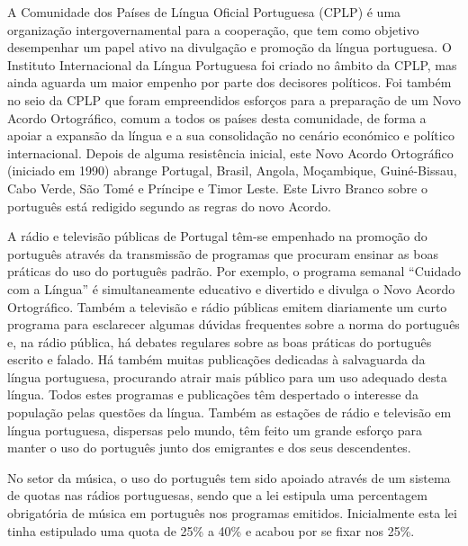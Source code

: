 \documentclass[]{../metanetpaper}
\begin{document}
\begin{multicols}{2}

A Comunidade dos Países de Língua Oficial Portuguesa (CPLP) é uma organização intergovernamental para a cooperação, que tem como objetivo desempenhar um papel ativo na divulgação e promoção da língua portuguesa. O Instituto Internacional da Língua Portuguesa foi criado no âmbito da CPLP, mas ainda aguarda um maior empenho por parte dos decisores políticos. Foi também no seio da CPLP que foram empreendidos esforços para a preparação de um Novo Acordo Ortográfico\cite{pinto}, comum a todos os países desta comunidade, de forma a apoiar a expansão da língua e a sua consolidação no cenário económico e político internacional. Depois de alguma resistência inicial, este Novo Acordo Ortográfico (iniciado em 1990) abrange Portugal, Brasil, Angola, Moçambique, Guiné-Bissau, Cabo Verde, São Tomé e Príncipe e Timor Leste. Este Livro Branco sobre o português está redigido segundo as regras do novo Acordo.

A rádio e televisão públicas de Portugal têm-se empenhado na promoção do português através da transmissão de programas que procuram ensinar as boas práticas do uso do português padrão. Por exemplo, o programa semanal “Cuidado com a Língua” é simultaneamente educativo e divertido e divulga o Novo Acordo Ortográfico. Também a televisão e rádio públicas emitem diariamente um curto programa para esclarecer algumas dúvidas frequentes sobre a norma do português e, na rádio pública, há debates regulares sobre as boas práticas do português escrito e falado. Há também muitas pu\-bli\-ca\-ções dedicadas à salvaguarda da língua portuguesa, procurando atrair mais público para um uso adequado desta língua. Todos estes programas e publicações têm despertado o interesse da população pelas questões da língua. Também as estações de rádio e televisão em língua portuguesa, dispersas pelo mundo, têm feito um grande esforço para manter o uso do português junto dos emigrantes e dos seus descendentes.


No setor da música, o uso do português tem sido apoiado através de um sistema de quotas nas rádios portuguesas, sendo que a lei estipula uma per\-cen\-ta\-gem obrigatória de música em português nos programas emitidos. Inicialmente esta lei tinha estipulado uma quota de 25\% a 40\% e acabou por se fixar nos 25\%. 


\end{multicols}
\end{document}
